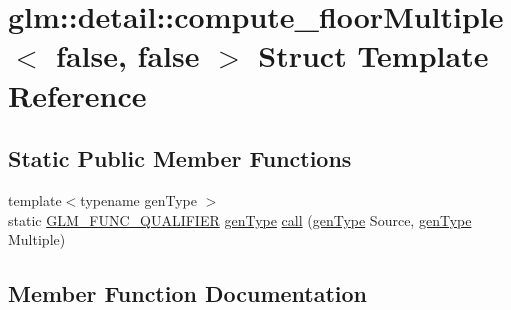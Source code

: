 \hypertarget{structglm_1_1detail_1_1compute__floor_multiple_3_01false_00_01false_01_4}{}\section{glm\+:\+:detail\+:\+:compute\+\_\+floor\+Multiple$<$ false, false $>$ Struct Template Reference}
\label{structglm_1_1detail_1_1compute__floor_multiple_3_01false_00_01false_01_4}
\subsection*{Static Public Member Functions}
\begin{DoxyCompactItemize}
\item 
{\footnotesize template$<$typename gen\+Type $>$ }\\static \mbox{\hyperlink{setup_8hpp_a33fdea6f91c5f834105f7415e2a64407}{G\+L\+M\+\_\+\+F\+U\+N\+C\+\_\+\+Q\+U\+A\+L\+I\+F\+I\+ER}} \mbox{\hyperlink{structglm_1_1detail_1_1gen_type}{gen\+Type}} \mbox{\hyperlink{structglm_1_1detail_1_1compute__floor_multiple_3_01false_00_01false_01_4_a795b0efa8ebff0dcbbc055cdccd2156c}{call}} (\mbox{\hyperlink{structglm_1_1detail_1_1gen_type}{gen\+Type}} Source, \mbox{\hyperlink{structglm_1_1detail_1_1gen_type}{gen\+Type}} Multiple)
\end{DoxyCompactItemize}


\subsection{Member Function Documentation}
\mbox{\label{structglm_1_1detail_1_1compute__floor_multiple_3_01false_00_01false_01_4_a795b0efa8ebff0dcbbc055cdccd2156c}} 
